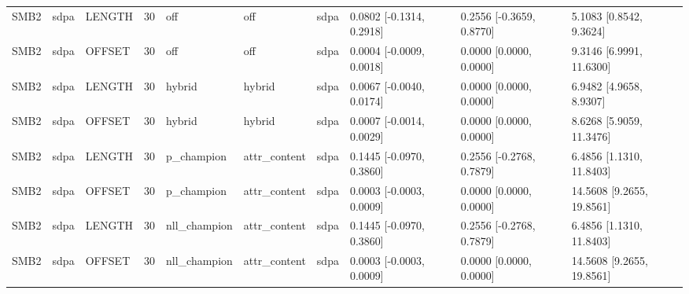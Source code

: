 \begin{tabular}{llllllllll}
SMB2 & sdpa & LENGTH & 30 & off & off & sdpa & 0.0802 [-0.1314, 0.2918] & 0.2556 [-0.3659, 0.8770] & 5.1083 [0.8542, 9.3624] \\
SMB2 & sdpa & OFFSET & 30 & off & off & sdpa & 0.0004 [-0.0009, 0.0018] & 0.0000 [0.0000, 0.0000] & 9.3146 [6.9991, 11.6300] \\
SMB2 & sdpa & LENGTH & 30 & hybrid & hybrid & sdpa & 0.0067 [-0.0040, 0.0174] & 0.0000 [0.0000, 0.0000] & 6.9482 [4.9658, 8.9307] \\
SMB2 & sdpa & OFFSET & 30 & hybrid & hybrid & sdpa & 0.0007 [-0.0014, 0.0029] & 0.0000 [0.0000, 0.0000] & 8.6268 [5.9059, 11.3476] \\
SMB2 & sdpa & LENGTH & 30 & p\_champion & attr\_content & sdpa & 0.1445 [-0.0970, 0.3860] & 0.2556 [-0.2768, 0.7879] & 6.4856 [1.1310, 11.8403] \\
SMB2 & sdpa & OFFSET & 30 & p\_champion & attr\_content & sdpa & 0.0003 [-0.0003, 0.0009] & 0.0000 [0.0000, 0.0000] & 14.5608 [9.2655, 19.8561] \\
SMB2 & sdpa & LENGTH & 30 & nll\_champion & attr\_content & sdpa & 0.1445 [-0.0970, 0.3860] & 0.2556 [-0.2768, 0.7879] & 6.4856 [1.1310, 11.8403] \\
SMB2 & sdpa & OFFSET & 30 & nll\_champion & attr\_content & sdpa & 0.0003 [-0.0003, 0.0009] & 0.0000 [0.0000, 0.0000] & 14.5608 [9.2655, 19.8561] \\
\hline
\end{tabular}
